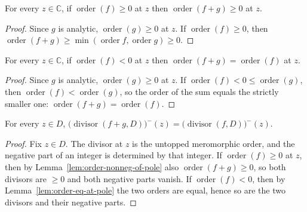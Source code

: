 \begin{lemma}
    \label{lem:order-nonneg-of-pole}
    \leanok
    For every $z \in \mathbb{C}$, if $\operatorname{order}(f) \ge 0$ at $z$ then
    $\operatorname{order}(f+g) \ge 0$ at $z$.
\end{lemma}
\begin{proof}
    Since $g$ is analytic, $\operatorname{order}(g) \ge 0$ at $z$. If
    $\operatorname{order}(f) \ge 0$, then $\operatorname{order}(f+g) \ge
    \min(\operatorname{order} f, \operatorname{order} g) \ge 0$.
\end{proof}

\begin{lemma}
    \label{lem:order-eq-at-pole}
    \leanok
    For every $z \in \mathbb{C}$, if $\operatorname{order}(f) < 0$ at $z$ then
    $\operatorname{order}(f+g) = \operatorname{order}(f)$ at $z$.
\end{lemma}
\begin{proof}
    Since $g$ is analytic, $\operatorname{order}(g) \ge 0$ at $z$. If
    $\operatorname{order}(f) < 0 \le \operatorname{order}(g)$, then
    $\operatorname{order}(f) < \operatorname{order}(g)$, so the order of the sum
    equals the strictly smaller one:
    $\operatorname{order}(f+g) = \operatorname{order}(f)$.
\end{proof}

\begin{lemma}
    \label{lem:negPart-eq}
    \leanok
    For every $z \in D$,
    $\big(\operatorname{divisor}(f+g,D)\big)^{-}(z)
       = \big(\operatorname{divisor}(f,D)\big)^{-}(z)$.
\end{lemma}
\begin{proof}
    Fix $z \in D$. The divisor at $z$ is the untopped meromorphic order, and the
    negative part of an integer is determined by that integer. If
    $\operatorname{order}(f) \ge 0$ at $z$, then by
    Lemma~\ref{lem:order-nonneg-of-pole} also $\operatorname{order}(f+g) \ge 0$,
    so both divisors are $\ge 0$ and both negative parts vanish. If
    $\operatorname{order}(f) < 0$, then by Lemma~\ref{lem:order-eq-at-pole} the
    two orders are equal, hence so are the two divisors and their negative parts.
\end{proof}

